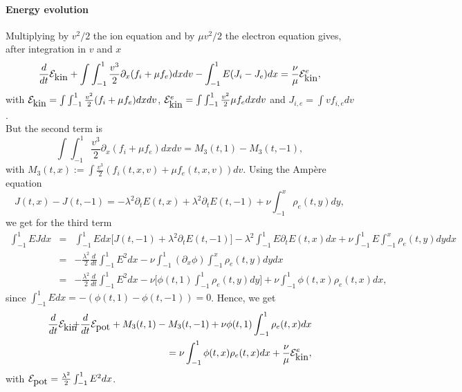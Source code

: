\documentclass[12pt,english]{article}
\theoremstyle{plain}\newtheorem{theorem}{Theorem}[section]
\theoremstyle{plain}\newtheorem{corollary}{Corollary}[section]
\theoremstyle{plain}\newtheorem{lemma}{Lemma}[section]
\begin{document}
\paragraph{Energy evolution\\}
Multiplying by $v^2/2$ the ion equation and by $\mu v^2/2$ the electron equation gives, after integration in $v$ and $x$
$$
\frac{d}{dt}{\cal E}_{\mbox{kin}} + \int\int_{-1}^1 \frac{v^3}{2}\partial_x (f_i + \mu f_e)dxdv -\int_{-1}^1  E (J_i-J_e) dx = \frac{\nu}{\mu} { \cal E}^e_{\mbox{kin}}, 
$$
with ${\cal E}_{\mbox{kin}} = \int\int_{-1}^1 \frac{v^2}{2}(f_i+\mu f_e) dx dv$, ${ \cal E}^e_{\mbox{kin}}= \int\int_{-1}^1 \frac{v^2}{2} \mu f_e dx dv$ and $J_{i,e} = \int v f_{i,e} dv$. \\
But the second term is 
$$
\int\int_{-1}^1 \frac{v^3}{2}\partial_x (f_i + \mu f_e)dxdv = M_3(t, 1)-M_3(t, -1), 
$$
with $M_3(t, x) := \int \frac{v^3}{2}(f_i(t, x, v) +\mu f_e(t, x, v))dv$. 
Using the Amp\`ere equation 
$$
J(t, x) - J(t, -1)= -\lambda^2\partial_t E(t, x) + \lambda^2\partial_t E(t, -1) + \nu \int_{-1}^x \rho_e (t, y)dy, 
$$
we get for the third term 
\begin{eqnarray*}
\int_{-1}^1 EJ dx &=& \int_{-1}^1 E dx \Big[ J(t, -1)+\lambda^2 \partial_t E(t, -1)\Big] -\lambda^2\int_{-1}^1  E \partial_t E(t, x) dx  
+\nu \int_{-1}^1 E \int_{-1}^x  \rho_e (t, y)dy dx\nonumber\\
&=&  - \frac{\lambda^2}{2} \frac{d}{dt} \int_{-1}^1  E^2 dx - \nu\int_{-1}^1 (\partial_x \phi) \int_{-1}^x  \rho_e (t, y)dy dx\nonumber\\
&=& - \frac{\lambda^2}{2} \frac{d}{dt} \int_{-1}^1  E^2 dx - \nu\Big[ \phi(t, 1)\int_{-1}^1  \rho_e (t, y)dy \Big] 
+ \nu\int_{-1}^1 \phi(t, x) \rho_e(t, x) dx, 
\end{eqnarray*}
since $\int_{-1}^1 E dx = -(\phi(t, 1)-\phi(t, -1)) = 0$. Hence, we get 
\begin{eqnarray*}
\frac{d}{dt}{\cal E}_{\mbox{kin}} \!\!\!\!\!\!\!\!\!&& +  \frac{d}{dt}{\cal E}_{\mbox{pot}} +M_3(t, 1)-M_3(t, -1) + \nu\phi(t, 1) \int_{-1}^1  \rho_e (t, x)dx\nonumber\\
&& = \nu \int_{-1}^1  \phi(t, x)\rho_e (t, x)dx + \frac{\nu}{\mu} { \cal E}^e_{\mbox{kin}}, 
\end{eqnarray*}
with ${\cal E}_{\mbox{pot}} = \frac{\lambda^2}{2}\int_{-1}^1 E^2dx$. 

\end{document}
